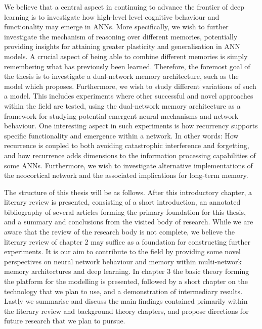 We believe that a central aspect in continuing to advance the frontier of deep learning is to investigate how high-level level cognitive behaviour and functionality may emerge in ANNs. More specifically, we wish to further investigate the mechanism of reasoning over different memories, potentially providing insights for attaining greater plasticity and generalisation in ANN models. A crucial aspect of being able to combine different memories is simply remembering what has previously been learned. Therefore, the foremost goal of the thesis is to investigate a dual-network memory architecture, such as the model which \cite{Hattori2014} proposes. Furthermore, we wish to study different variations of such a model. This includes experiments where other successful and novel approaches within the field are tested, using the dual-network memory architecture as a framework for studying potential emergent neural mechanisms and network behaviour.
One interesting aspect in such experiments is how recurrency supports specific functionality and emergence within a network. In other words: How recurrence is coupled to both avoiding catastrophic interference and forgetting, and how recurrence adds dimensions to the information processing capabilities of some ANNs. Furthermore, we wish to investigate alternative implementations of the neocortical network and the associated implications for long-term memory.

The structure of this thesis will be as follows. After this introductory chapter, a literary review is presented, consisting of a short introduction, an annotated bibliography of several articles forming the primary foundation for this thesis, and a summary and conclusions from the visited body of research. While we are aware that the review of the research body is not complete, we believe the literary review of chapter 2 may suffice as a foundation for constructing further experiments. It is our aim to contribute to the field by providing some novel perspectives on neural network behaviour and memory within multi-network memory architectures and deep learning. In chapter 3 the basic theory forming the platform for the modelling is presented, followed by a short chapter on the technology that we plan to use, and a demonstration of intermediary results. Lastly we summarise and discuss the main findings contained primarily within the literary review and background theory chapters, and propose directions for future research that we plan to pursue.


\cleardoublepage
